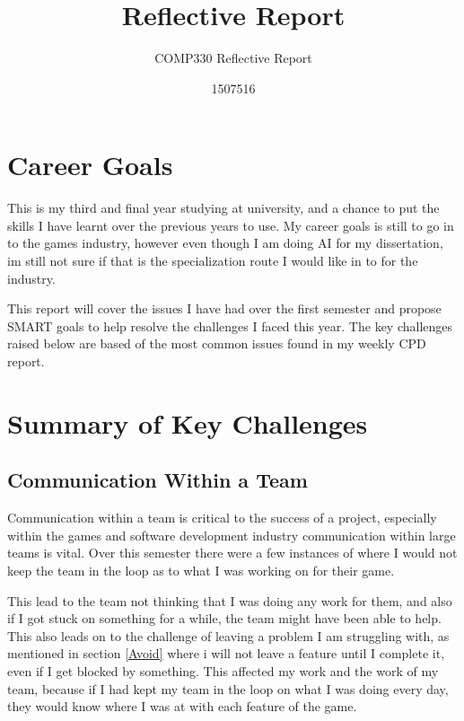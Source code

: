 \documentclass{scrartcl}
\title{Reflective Report}
\subtitle{COMP330 Reflective Report}
\author{1507516}
\begin{document}
\maketitle


\section{Career Goals}
This is my third and final year studying at university, and a chance to put the skills I have learnt over the previous years to use. 
My career goals is still to go in to the games industry, however even though I am doing AI for my dissertation, im still not sure if that is the specialization route I would like in to for the industry.

This report will cover the issues I have had over the first semester and propose SMART goals to help resolve the challenges I faced this year.
The key challenges raised below are based of the most common issues found in my weekly CPD report.


\section{Summary of Key Challenges}


\subsection{Communication Within a Team} \label{Comm}

Communication within a team is critical to the success of a project, especially within the games and software development industry communication within large teams is vital.
Over this semester there were a few instances of where I would not keep the team in the loop as to what I was working on for their game.

\par

This lead to the team not thinking that I was doing any work for them, and also if I got stuck on something for a while, the team might have been able to help.
This also leads on to the challenge of leaving a problem I am struggling with, as mentioned in section \ref{Avoid} where i will not leave a feature until I complete it, even if I get blocked by something.
This affected my work and the work of my team, because if I had kept my team in the loop on what I was doing every day, they would know where I was at with each feature of the game.
\par
\end{document}
